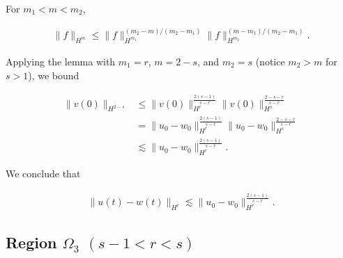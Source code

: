 \documentclass{beamer}
\numberwithin{equation}{section}
\begin{document}
 \begin{frame}
     \begin{lemma}[Interpolation]
  For $m_{1} < m < m_{2}$,
  
  
  \begin{equation*}
  \begin{split}
    \| f \|_{H^{m}} \le \| f \|_{H^{m_{1}}}^{(m_{2}-m)/(m_{2} - m_{1})} \| f
    \|_{H^{m_{2}}}^{(m -m_{1})/(m_{2} - m_{1})}.
  \end{split}
  \end{equation*}
  
  
  
   
  
\label{lem:interp}
\end{lemma}

\pause
Applying the lemma with $m_{1} =r$, $m = 2-s$, and $m_{2} = s$ (notice
$m_{2} > m$ for $s > 1$), we bound 


\begin{equation*}
\begin{split}
    \| v(0) \|_{H^{2-s}} 
    & \le \| v(0) \|_{H^{r}}^{\frac{2(s-1)}{s-r}} \|v(0)
  \|_{H^{s}}^{\frac{2-s-r}{s-r}}
  \\
  & = \| u_{0} - w_{0} \|_{H^{r}}^{\frac{2(s-1)}{s-r}} \|u_{0} - w_{0}
  \|_{H^{s}}^{\frac{2-s-r}{s-r}}
  \\
  & \lesssim \| u_{0} - w_{0} \|_{H^{r}}^{\frac{2(s-1)}{s-r}}.
\end{split}
\end{equation*}

\pause
We conclude that


\begin{equation*}
\begin{split}
  \| u(t) - w(t) \|_{H^{r}} \lesssim \|u_{0} - w_{0} \|_{H^{r}}^{\frac{2(s-1)}{s-r}}.
\end{split}
\end{equation*}

\end{frame}

\subsection{Region $\Omega_{3}$ $(s-1 < r < s)$} 
\end{document}
